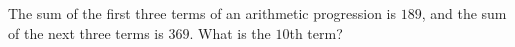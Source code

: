 The sum of the first three terms of an arithmetic progression is $189$, and the sum of the next three terms is $369$. What is the $10$th term?
